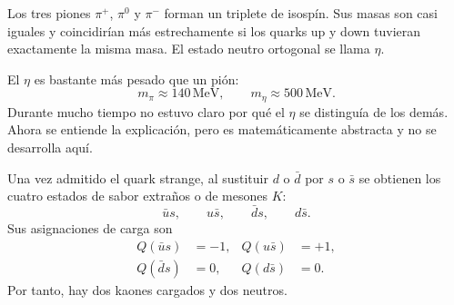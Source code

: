Los tres piones \(\pi^+\), \(\pi^0\) y \(\pi^-\) forman un triplete de isospín. Sus masas son casi iguales y coincidirían más estrechamente si los quarks up y down tuvieran exactamente la misma masa. El estado neutro ortogonal se llama \(\eta\).

El \(\eta\) es bastante más pesado que un pión:
\begin{equation}
m_\pi \approx 140\,\mathrm{MeV},
\qquad
m_\eta \approx 500\,\mathrm{MeV}.
\end{equation}
Durante mucho tiempo no estuvo claro por qué el \(\eta\) se distinguía de los demás. Ahora se entiende la explicación, pero es matemáticamente abstracta y no se desarrolla aquí.

\begin{classroomqa}
\end{classroomqa}

\begin{classroomqa}
\end{classroomqa}

\begin{classroomqa}
\end{classroomqa}

Una vez admitido el quark strange, al sustituir \(d\) o \(\bar d\) por \(s\) o \(\bar s\) se obtienen los cuatro estados de sabor extraños o de mesones \(K\):
\begin{equation}
\bar u s,\qquad u\bar s,\qquad \bar d s,\qquad d\bar s.
\end{equation}
Sus asignaciones de carga son
\begin{align}
Q(\bar u s) &=-1,
&
Q(u\bar s) &=+1,
\\
Q(\bar d s) &=0,
&
Q(d\bar s) &=0.
\end{align}
Por tanto, hay dos kaones cargados y dos neutros.

